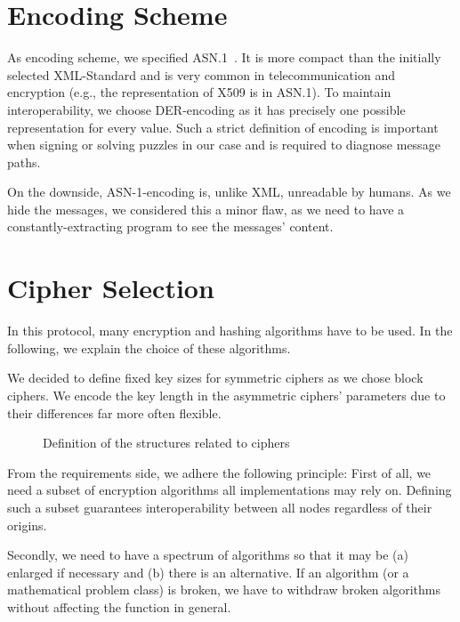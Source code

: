 \section{Encoding Scheme}
As encoding scheme, we specified ASN.1~\cite{dis19878824}. It is more compact than the initially selected XML-Standard and is very common in telecommunication and encryption (e.g., the representation of X509 is in ASN.1). To maintain interoperability, we choose DER-encoding as it has precisely one possible representation for every value. Such a strict definition of encoding is important when signing or solving puzzles in our case and is required to diagnose message paths.

On the downside, ASN-1-encoding is, unlike XML, unreadable by humans. As we hide the messages, we considered this a minor flaw, as we need to have a constantly-extracting program to see the messages' content.

\section{Cipher Selection}
In this protocol, many encryption and hashing algorithms have to be used. In the following, we explain the choice of these algorithms. 

We decided to define fixed key sizes for symmetric ciphers as we chose block ciphers. We encode the key length in the asymmetric ciphers' parameters due to their differences far more often flexible.%

\begin{figure}[ht]
	
	\caption{Definition of the structures related to ciphers}
	\label{fig:defCiphers}
\end{figure}

From the requirements side, we adhere the following principle:
First of all, we need a subset of encryption algorithms all implementations may rely on. Defining such a subset guarantees interoperability between all nodes regardless of their origins. 

Secondly, we need to have a spectrum of algorithms so that it may be (a) enlarged if necessary and (b) there is an alternative. If an algorithm (or a mathematical problem class) is broken, we have to withdraw broken algorithms without affecting the function in general. 

